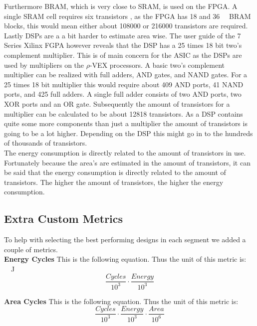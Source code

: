 Furthermore BRAM, which is very close to SRAM, is used on the FPGA. 
A single SRAM cell requires six transistors  \cite{betz}, as the FPGA has \num{18} and \SI{36}{\kibi\byte} BRAM blocks, this would mean either about \num{108000} or \num{216000} transistors are required. 
Lastly DSPs are a a bit harder to estimate area wise. 
The user guide of the 7 Series Xilinx FGPA however reveals that the DSP has a \num{25} times \num{18} bit two's complement multiplier. 
This is of main concern for the ASIC as the DSPs are used by multipliers on the $\rho$-VEX processors. 
A basic two's complement multiplier can be realized with full adders, AND gates, and NAND gates. 
For a \num{25} times \num{18} bit multiplier this would require about \num{409} AND ports, \num{41} NAND ports, and \num{425} full adders. 
A single full adder consists of two AND ports, two XOR ports and an OR gate.
Subsequently the amount of transistors for a multiplier can be calculated to be about \num{12818} transistors.
As a DSP contains quite some more components than just a multiplier the amount of transistors is going to be a lot higher.
Depending on the DSP this might go in to the hundreds of thousands of transistors.\\
The energy consumption is directly related to the amount of transistors in use. 
Fortunately because the area's are estimated in the amount of transistors, it can be said that the energy consumption is directly related to the amount of transistors. 
The higher the amount of transistors, the higher the energy consumption.

\subsection{Extra Custom Metrics}
\label{ssec:soc-design-extra-custom-metrics}
To help with selecting the best performing designs in each segment we added a couple of metrics.\\

\textbf{Energy Cycles}
This is the following equation. Thus the unit of this metric is: \si{\kilo\cycles\joule}
\begin{equation}
\frac{Cycles}{10^3} \cdot \frac{Energy}{10^3}
\end{equation}

\textbf{Area Cycles}
This is the following equation. Thus the unit of this metric is: \si{\kilo\cycles\giga\transistors}
\begin{equation}
\frac{Cycles}{10^3} \cdot \frac{Energy}{10^3} \cdot \frac{Area}{10^6}
\end{equation}

